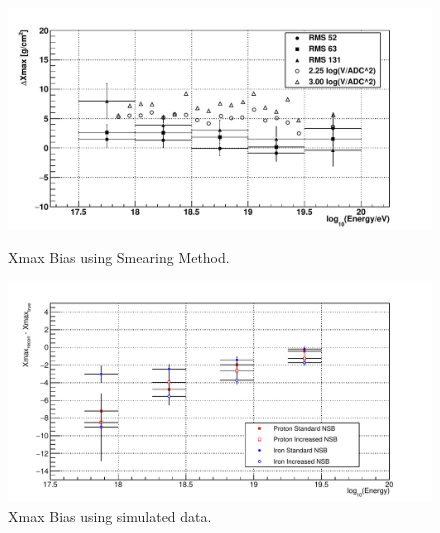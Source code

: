 \begin{figure}
\centering
\includegraphics[width=\textwidth]{chapters/graphs/SelectionEff/Smearing_RealData_XmaxBias.pdf}
\caption{Xmax Bias using Smearing Method.}
\vspace{3mm}
\includegraphics[width=\textwidth]{chapters/graphs/SelectionEff/Simulation_ProtonIron_XmaxBias.pdf}
\caption{Xmax Bias using simulated data.}
\end{figure}

